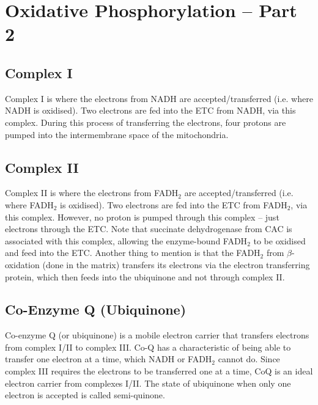 \section{Oxidative Phosphorylation -- Part 2}

\begin{center}
\end{center}

\subsection{Complex I}

Complex I is where the electrons from NADH are accepted/transferred (i.e. where NADH is oxidised).
Two electrons are fed into the ETC from NADH, via this complex.
During this process of transferring the electrons, four protons are pumped into the intermembrane space of the mitochondria.

\subsection{Complex II}

Complex II is where the electrons from FADH$_2$ are accepted/transferred (i.e. where FADH$_2$ is oxidised).
Two electrons are fed into the ETC from FADH$_2$, via this complex.
However, no proton is pumped through this complex -- just electrons through the ETC.
Note that succinate dehydrogenase from CAC is associated with this complex, allowing the enzyme-bound FADH$_2$ to be oxidised and feed into the ETC.
Another thing to mention is that the FADH$_2$ from $\beta$-oxidation (done in the matrix) transfers its electrons via the electron transferring protein, which then feeds into the ubiquinone and not through complex II.

\subsection{Co-Enzyme Q (Ubiquinone)}

Co-enzyme Q (or ubiquinone) is a mobile electron carrier that transfers electrons from complex I/II to complex III.
Co-Q has a characteristic of being able to transfer one electron at a time, which NADH or FADH$_2$ cannot do.
Since complex III requires the electrons to be transferred one at a time, CoQ is an ideal electron carrier from complexes I/II.
The state of ubiquinone when only one electron is accepted is called semi-quinone.

